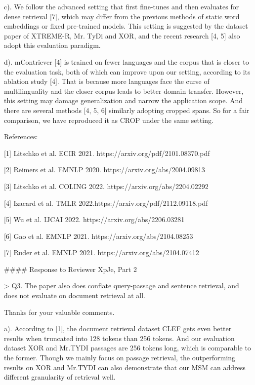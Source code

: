 c). We follow the advanced setting that first fine-tunes and then evaluates for dense retrieval [7], which may differ from the previous methods of static word embeddings or fixed pre-trained models. This setting is suggested by the dataset paper of XTREME-R, Mr. TyDi and XOR, and the recent research [4, 5] also adopt this evaluation paradigm. 

d). mContriever [4] is trained on fewer languages and the corpus that is closer to the evaluation task, both of which can improve upon our setting, according to its ablation study [4]. That is because more languages face the curse of multilinguality and the closer corpus leads to better domain transfer. However, this setting may damage generalization and narrow the application scope. And there are several methods [4, 5, 6] similarly adopting cropped spans. So for a fair comparison, we have reproduced it as CROP under the same setting.



References:

[1] Litschko et al. ECIR 2021. https://arxiv.org/pdf/2101.08370.pdf

[2] Reimers et al. EMNLP 2020. https://arxiv.org/abs/2004.09813

[3] Litschko et al. COLING 2022. https://arxiv.org/abs/2204.02292

[4] Izacard et al. TMLR 2022.https://arxiv.org/pdf/2112.09118.pdf 

[5] Wu et al. IJCAI 2022. https://arxiv.org/abs/2206.03281

[6] Gao et al. EMNLP 2021. https://arxiv.org/abs/2104.08253

[7] Ruder et al. EMNLP 2021. https://arxiv.org/abs/2104.07412



#### Response to Reviewer XpJe, Part 2

> Q3. The paper also does conflate query-passage and sentence retrieval, and does not evaluate on document retrieval at all. 

Thanks for your valuable comments. 

a). According to [1], the document retrieval dataset CLEF gets even better results when truncated into 128 tokens than 256 tokens. And our evaluation dataset XOR and Mr.TYDI passages are 256 tokens long, which is comparable to the former. Though we mainly focus on passage retrieval, the outperforming results on XOR and Mr.TYDI can also demonstrate that our MSM can address different granularity of retrieval well. 

